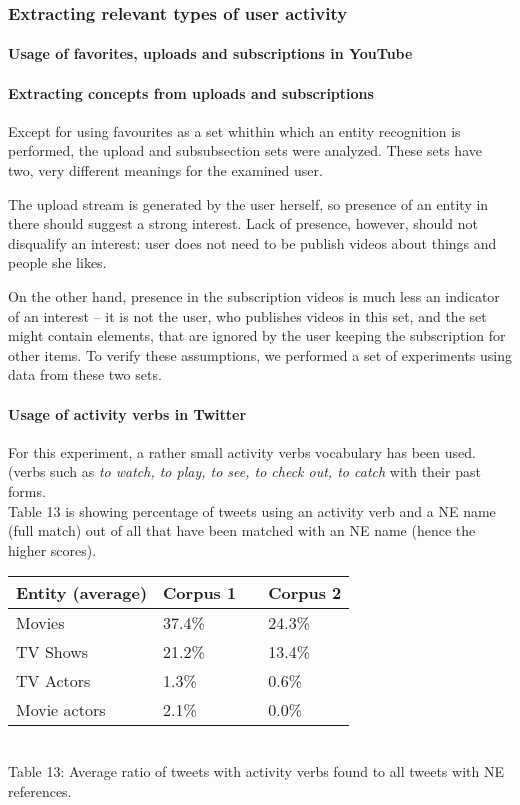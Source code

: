 \subsubsection{Extracting relevant types of user activity}

\paragraph{Usage of favorites, uploads and subscriptions in YouTube}

\paragraph{Extracting concepts from uploads and subscriptions} Except for using
favourites as a set whithin which an entity recognition is performed, the
upload and subsubsection sets were analyzed. These sets have two, very
different meanings for the examined user.

The upload stream is generated by the user herself, so presence of an entity in
there should suggest a strong interest. Lack of presence, however, should not
disqualify an interest: user does not need to be publish videos about things
and people she likes.

On the other hand, presence in the subscription videos is much less an
indicator of an interest -- it is not the user, who publishes videos in this
set, and the set might contain elements, that are ignored by the user keeping
the subscription for other items. To verify these assumptions, we performed a
set of experiments using data from these two sets.

\paragraph{Usage of activity verbs in Twitter}
For this experiment, a rather small activity verbs vocabulary has been used. (verbs such
as \textit{to watch, to play, to see, to check out, to catch} with their past forms.
\\ Table 13 is showing percentage of tweets using an activity verb
and a NE name (full match) out of all that have been matched with an
NE name (hence the higher scores).

\begin{center}
  \begin{tabular}{ | p{4cm} | p{2cm} | p{1cm}| p{2cm} | } \hline
    Entity (average) & Corpus 1 & & Corpus 2 \\ \hline
    Movies & 37.4\% & & 24.3\% \\ \hline
    TV Shows & 21.2\% & & 13.4\% \\ \hline
    TV Actors & 1.3\% & & 0.6\% \\ \hline
    Movie actors & 2.1\% & & 0.0\% \\ \hline
  \end{tabular} \\
  Table 13: Average ratio of tweets with activity verbs found to all tweets with NE references. \\
\end{center}

